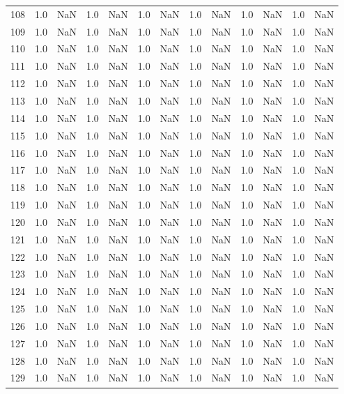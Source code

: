 \begin{tabular}{lrrrrrrrrrrrr}
108 & 1.0 & NaN & 1.0 & NaN & 1.0 & NaN & 1.0 & NaN & 1.0 & NaN & 1.0 & NaN \\
109 & 1.0 & NaN & 1.0 & NaN & 1.0 & NaN & 1.0 & NaN & 1.0 & NaN & 1.0 & NaN \\
110 & 1.0 & NaN & 1.0 & NaN & 1.0 & NaN & 1.0 & NaN & 1.0 & NaN & 1.0 & NaN \\
111 & 1.0 & NaN & 1.0 & NaN & 1.0 & NaN & 1.0 & NaN & 1.0 & NaN & 1.0 & NaN \\
112 & 1.0 & NaN & 1.0 & NaN & 1.0 & NaN & 1.0 & NaN & 1.0 & NaN & 1.0 & NaN \\
113 & 1.0 & NaN & 1.0 & NaN & 1.0 & NaN & 1.0 & NaN & 1.0 & NaN & 1.0 & NaN \\
114 & 1.0 & NaN & 1.0 & NaN & 1.0 & NaN & 1.0 & NaN & 1.0 & NaN & 1.0 & NaN \\
115 & 1.0 & NaN & 1.0 & NaN & 1.0 & NaN & 1.0 & NaN & 1.0 & NaN & 1.0 & NaN \\
116 & 1.0 & NaN & 1.0 & NaN & 1.0 & NaN & 1.0 & NaN & 1.0 & NaN & 1.0 & NaN \\
117 & 1.0 & NaN & 1.0 & NaN & 1.0 & NaN & 1.0 & NaN & 1.0 & NaN & 1.0 & NaN \\
118 & 1.0 & NaN & 1.0 & NaN & 1.0 & NaN & 1.0 & NaN & 1.0 & NaN & 1.0 & NaN \\
119 & 1.0 & NaN & 1.0 & NaN & 1.0 & NaN & 1.0 & NaN & 1.0 & NaN & 1.0 & NaN \\
120 & 1.0 & NaN & 1.0 & NaN & 1.0 & NaN & 1.0 & NaN & 1.0 & NaN & 1.0 & NaN \\
121 & 1.0 & NaN & 1.0 & NaN & 1.0 & NaN & 1.0 & NaN & 1.0 & NaN & 1.0 & NaN \\
122 & 1.0 & NaN & 1.0 & NaN & 1.0 & NaN & 1.0 & NaN & 1.0 & NaN & 1.0 & NaN \\
123 & 1.0 & NaN & 1.0 & NaN & 1.0 & NaN & 1.0 & NaN & 1.0 & NaN & 1.0 & NaN \\
124 & 1.0 & NaN & 1.0 & NaN & 1.0 & NaN & 1.0 & NaN & 1.0 & NaN & 1.0 & NaN \\
125 & 1.0 & NaN & 1.0 & NaN & 1.0 & NaN & 1.0 & NaN & 1.0 & NaN & 1.0 & NaN \\
126 & 1.0 & NaN & 1.0 & NaN & 1.0 & NaN & 1.0 & NaN & 1.0 & NaN & 1.0 & NaN \\
127 & 1.0 & NaN & 1.0 & NaN & 1.0 & NaN & 1.0 & NaN & 1.0 & NaN & 1.0 & NaN \\
128 & 1.0 & NaN & 1.0 & NaN & 1.0 & NaN & 1.0 & NaN & 1.0 & NaN & 1.0 & NaN \\
129 & 1.0 & NaN & 1.0 & NaN & 1.0 & NaN & 1.0 & NaN & 1.0 & NaN & 1.0 & NaN \\

\end{tabular}
